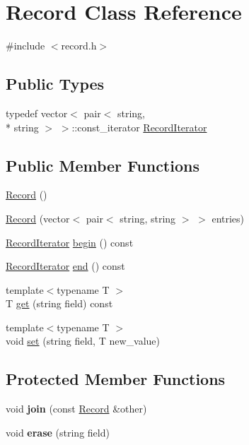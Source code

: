 \hypertarget{class_record}{\section{Record Class Reference}
\label{class_record}
}


{\ttfamily \#include $<$record.\-h$>$}

\subsection*{Public Types}
\begin{DoxyCompactItemize}
\item 
typedef vector$<$ pair$<$ string, \\*
string $>$ $>$\-::const\-\_\-iterator \hyperlink{class_record_ae8a1c90a4d896429d087ccc1f205f9b7}{Record\-Iterator}
\end{DoxyCompactItemize}
\subsection*{Public Member Functions}
\begin{DoxyCompactItemize}
\item 
\hyperlink{class_record_ae8ee53ffec6ff4dac9911517d47e86a5}{Record} ()
\item 
\hyperlink{class_record_af6b85f753bb8dfea3e29728490b3d2a3}{Record} (vector$<$ pair$<$ string, string $>$ $>$ entries)
\item 
\hyperlink{class_record_ae8a1c90a4d896429d087ccc1f205f9b7}{Record\-Iterator} \hyperlink{class_record_a4f65302d712b34e19b8bac9aeff06016}{begin} () const 
\item 
\hyperlink{class_record_ae8a1c90a4d896429d087ccc1f205f9b7}{Record\-Iterator} \hyperlink{class_record_a50ab91b0bb46a381cd3e3b297e4b9d9e}{end} () const 
\item 
{\footnotesize template$<$typename T $>$ }\\T \hyperlink{class_record_a5b6392211018031e67e4d4c599046061}{get} (string field) const 
\item 
{\footnotesize template$<$typename T $>$ }\\void \hyperlink{class_record_ab3efe3a4a4e6a9359bbc82782084c821}{set} (string field, T new\-\_\-value)
\end{DoxyCompactItemize}
\subsection*{Protected Member Functions}
\begin{DoxyCompactItemize}
\item 
\hypertarget{class_record_a851228aba42b5cb2516b29cf6632df8b}{void {\bfseries join} (const \hyperlink{class_record}{Record} \&other)}\label{class_record_a851228aba42b5cb2516b29cf6632df8b}

\item 
\hypertarget{class_record_aba8b5c0a2299a45d068db1ce818051e4}{void {\bfseries erase} (string field)}\label{class_record_aba8b5c0a2299a45d068db1ce818051e4}

\end{DoxyCompactItemize}
